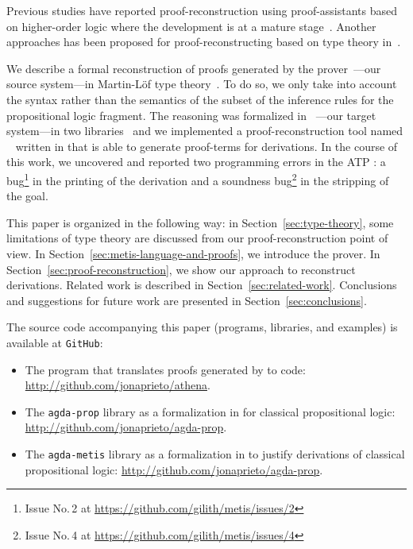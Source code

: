 \documentclass[../paper.tex]{subfiles}
\begin{document}
Previous studies have reported proof-reconstruction using
proof-assistants based on higher-order logic where the development is at a mature
stage~\cite{paulson2010three,hurlin07practical,kaliszyk2013}.
Another approaches has been proposed for proof-reconstructing based
on type theory in~\cite{Bezem2002,kanso2016light,Keller2013}.

We describe a formal reconstruction of proofs generated by the \Metis
prover~\cite{hurd2003first}---our source system---in Martin-Löf type
theory~\cite{Nordstrom-Petersson-Smith-1990}. To do so, we only  take
into account the syntax rather than the semantics of the subset of the
\Metis inference rules for the propositional logic fragment. The
\Metis reasoning was formalized in \Agda~\cite{agdateam}---our target
system---in two libraries~\cite{AgdaProp,AgdaMetis} and we implemented
a proof-reconstruction tool named \Athena~\cite{Athena} written in
\Haskell that is able to generate \Agda proof-terms for \Metis
derivations.  In the course of this work, we uncovered and reported
two programming errors in the ATP \Metis: a bug\footnote{Issue No.\,2
at \url{https://github.com/gilith/metis/issues/2}} in the printing of
the derivation and a soundness bug\footnote{Issue No.\,4 at
\url{https://github.com/gilith/metis/issues/4}} in the stripping of
the goal.


This paper is organized in the following way: in
Section~\ref{sec:type-theory}, some limitations of type theory are
discussed from our proof-reconstruction point of view.  In
Section~\ref{sec:metis-language-and-proofs}, we introduce the \Metis
prover.  In Section~\ref{sec:proof-reconstruction}, we show our
approach to reconstruct \Metis derivations.  Related work is described
in Section~\ref{sec:related-work}.  Conclusions and suggestions for
future work are presented in Section~\ref{sec:conclusions}.

The source code accompanying this paper (programs, libraries, and
examples) is available at \verb!GitHub!:

\begin{itemize}
  \item The \Athena program that translates proofs generated by \Metis
  to \Agda code: \url{http://github.com/jonaprieto/athena}.

  \item The \verb!agda-prop! library as a formalization in \Agda for
    classical propositional logic:
  \url{http://github.com/jonaprieto/agda-prop}.

  \item The \verb!agda-metis! library as a formalization in \Agda to
  justify \Metis derivations of classical propositional logic:
  \url{http://github.com/jonaprieto/agda-prop}.

\end{itemize}
\end{document}
